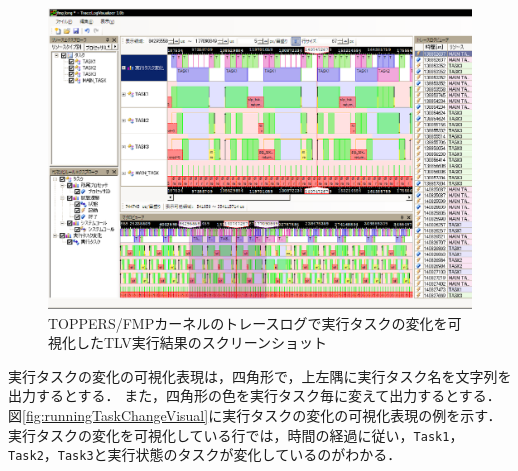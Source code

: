 \begin{figure}[!h]
\begin{center}
\includegraphics[width=15cm]{img/fmpRunTaskTLVscreenShot.eps}
\caption{TOPPERS/FMPカーネルのトレースログで実行タスクの変化を可視化したTLV実行結果のスクリーンショット}
\label{fig:fmppTLVscreenShot}
\end{center}
\end{figure}

実行タスクの変化の可視化表現は，四角形で，上左隅に実行タスク名を文字列を出力するとする．
また，四角形の色を実行タスク毎に変えて出力するとする．
図\ref{fig:runningTaskChangeVisual}に実行タスクの変化の可視化表現の例を示す．
実行タスクの変化を可視化している行では，時間の経過に従い，{\tt Task1}，{\tt Task2}，{\tt Task3}と実行状態のタスクが変化しているのがわかる．
\fi